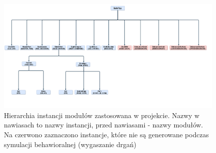 \documentclass[12pt] {article}
\begin{document}
\begin{landscape}
\begin{figure}[H]
\centering
\includegraphics[width=1.5\textwidth]{res/HDL_Hierarchy.pdf}
\caption{Hierarchia instancji modułów zastosowana w projekcie. Nazwy w nawiasach to nazwy instancji, przed nawiasami - nazwy modułów. Na czerwono zaznaczono instancje, które nie są generowane podczas symulacji behawioralnej (wygaszanie drgań)} 
\label{fig:hier}
\end{figure}
\end{landscape}
\end{document}
